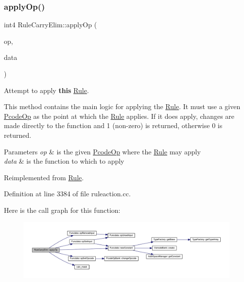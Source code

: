 \subsubsection{\texorpdfstring{applyOp()}{applyOp()}}
{\footnotesize\ttfamily int4 Rule\+Carry\+Elim\+::apply\+Op (\begin{DoxyParamCaption}\item[{\mbox{\hyperlink{class_pcode_op}{Pcode\+Op}} $\ast$}]{op,  }\item[{\mbox{\hyperlink{class_funcdata}{Funcdata}} \&}]{data }\end{DoxyParamCaption})\hspace{0.3cm}{\ttfamily [virtual]}}



Attempt to apply {\bfseries{this}} \mbox{\hyperlink{class_rule}{Rule}}. 

This method contains the main logic for applying the \mbox{\hyperlink{class_rule}{Rule}}. It must use a given \mbox{\hyperlink{class_pcode_op}{Pcode\+Op}} as the point at which the \mbox{\hyperlink{class_rule}{Rule}} applies. If it does apply, changes are made directly to the function and 1 (non-\/zero) is returned, otherwise 0 is returned. 
\begin{DoxyParams}{Parameters}
{\em op} & is the given \mbox{\hyperlink{class_pcode_op}{Pcode\+Op}} where the \mbox{\hyperlink{class_rule}{Rule}} may apply \\
\hline
{\em data} & is the function to which to apply \\
\hline
\end{DoxyParams}


Reimplemented from \mbox{\hyperlink{class_rule_a4e3e61f066670175009f60fb9dc60848}{Rule}}.



Definition at line 3384 of file ruleaction.\+cc.

Here is the call graph for this function\+:
\nopagebreak
\begin{figure}[H]
\begin{center}
\leavevmode
\includegraphics[width=350pt]{class_rule_carry_elim_ab7a660e29b328d6348a1cacace3d9844_cgraph}
\end{center}
\end{figure}
\mbox{\label{class_rule_carry_elim_a31e871206ad24e926b0ae9d19825ef6b}} 

